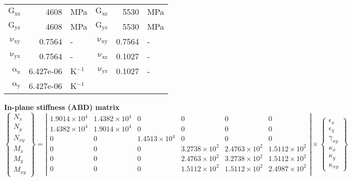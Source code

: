 \begin{table}[!htbp]
\begin{tabular}[t]{rrlrrl}
      $\mathrm{G_{xz}}$ &     4608 & MPa & $\mathrm{G_{xz}}$ &     5530 & MPa\\
      $\mathrm{G_{yz}}$ &     4608 & MPa &  $\mathrm{G_{yz}}$ &     5530 & MPa\\
      $\mathrm{\nu_{xy}}$ & 0.7564 &- &$\mathrm{\nu_{xy}}$ & 0.7564 &-\\
      $\mathrm{\nu_{yx}}$ & 0.7564 &- & $\mathrm{\nu_{xz}}$ & 0.1027 &-\\
      $\mathrm{\alpha_x}$ & 6.427e-06 & K$^{-1}$ &$\mathrm{\nu_{yz}}$ & 0.1027 &-\\
      $\mathrm{\alpha_y}$ & 6.427e-06 & K$^{-1}$\\
      \bottomrule
    \end{tabular}
  \vbox{
    \vbox{\small\textbf{In-plane stiffness (ABD) matrix}\\[-3mm]
      \tiny\[\left\{\begin{array}{c}
          N_x\\ N_y\\ N_{xy}\\ M_x\\ M_y\\ M_{xy}
        \end{array}\right\} = 
      \left|\begin{array}{cccccc}
           1.9014\times 10^{4} &  1.4382\times 10^{4} & 0 & 0 & 0 & 0\\
           1.4382\times 10^{4} &  1.9014\times 10^{4} & 0 & 0 & 0 & 0\\
          0 & 0 &  1.4513\times 10^{4} & 0 & 0 & 0\\
          0 & 0 & 0 &  3.2738\times 10^{2} &  2.4763\times 10^{2} &  1.5112\times 10^{2}\\
          0 & 0 & 0 &  2.4763\times 10^{2} &  3.2738\times 10^{2} &  1.5112\times 10^{2}\\
          0 & 0 & 0 &  1.5112\times 10^{2} &  1.5112\times 10^{2} &  2.4987\times 10^{2}\\
          \end{array}\right| \times
        \left\{\begin{array}{c}
            \epsilon_x\\[2pt] \epsilon_y\\[2pt] \gamma_{xy}\\[2pt]
            \kappa_x\\[2pt] \kappa_y\\[2pt] \kappa_{xy}
          \end{array}\right\}\]
    }
}
\end{table}
